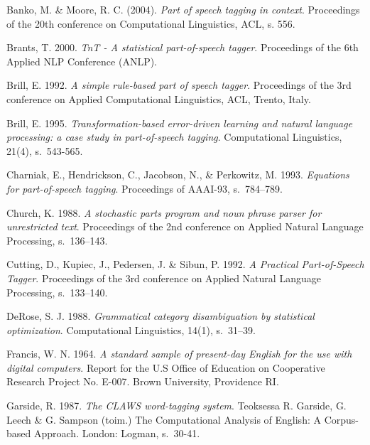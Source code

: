 \documentclass[utf8,bachelor,manualbib]{gradu3}
\begin{document}
\begin{thebibliography}{}

Banko, M. \& Moore, R. C. (2004). \textit{Part of speech tagging in context}. Proceedings of the 20th conference on Computational Linguistics, ACL, s. 556.

Brants, T. 2000. \textit{TnT - A statistical part-of-speech tagger}. Proceedings of the 6th Applied NLP Conference (ANLP).

Brill, E. 1992. \textit{A simple rule-based part of speech tagger}. Proceedings of the 3rd conference on Applied Computational Linguistics, ACL, Trento, Italy.

Brill, E. 1995. \textit{Transformation-based error-driven learning and natural language processing: a case study in part-of-speech tagging}. Computational Linguistics, 21(4), s.~543-565.

Charniak, E., Hendrickson, C., Jacobson, N., \& Perkowitz, M. 1993. \textit{Equations for part-of-speech tagging}. Proceedings of AAAI-93, s.~784--789.

Church, K. 1988. \textit{A stochastic parts program and noun phrase parser for unrestricted text}. Proceedings of the 2nd conference on Applied Natural Language Processing, s.~136--143.

Cutting, D., Kupiec, J., Pedersen, J. \& Sibun, P. 1992. \textit{A Practical Part-of-Speech Tagger}. Proceedings of the 3rd conference on Applied Natural Language Processing, s.~133--140.

DeRose, S. J. 1988. \textit{Grammatical category disambiguation by statistical optimization}. Computational Linguistics, 14(1), s.~31--39.

Francis, W. N. 1964. \textit{A standard sample of present-day English for the use with digital computers}. Report for the U.S Office of Education on Cooperative Research Project No. E-007.
Brown University, Providence RI.

Garside, R. 1987. \textit{The CLAWS word-tagging system}. Teoksessa R. Garside, G. Leech \& G. Sampson (toim.) The Computational Analysis of English: A Corpus-based Approach. London: Logman, s.~30-41.


\end{thebibliography}
\end{document}
